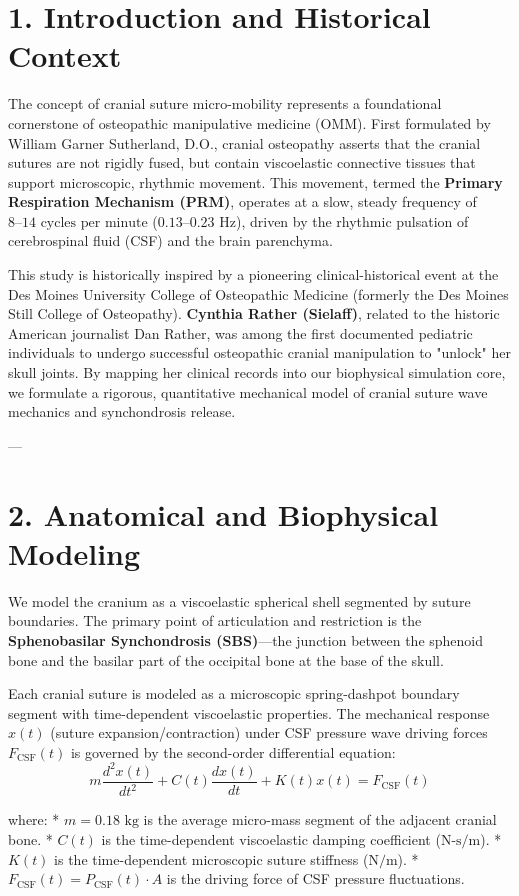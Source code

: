 \documentclass[11pt,twocolumn]{article}
\begin{document}
\section{1. Introduction and Historical Context}
The concept of cranial suture micro-mobility represents a foundational cornerstone of osteopathic manipulative medicine (OMM). First formulated by William Garner Sutherland, D.O., cranial osteopathy asserts that the cranial sutures are not rigidly fused, but contain viscoelastic connective tissues that support microscopic, rhythmic movement. This movement, termed the \textbf{Primary Respiration Mechanism (PRM)}, operates at a slow, steady frequency of $8\text{--}14\text{ cycles per minute}$ ($0.13\text{--}0.23\text{ Hz}$), driven by the rhythmic pulsation of cerebrospinal fluid (CSF) and the brain parenchyma.

This study is historically inspired by a pioneering clinical-historical event at the Des Moines University College of Osteopathic Medicine (formerly the Des Moines Still College of Osteopathy). \textbf{Cynthia Rather (Sielaff)}, related to the historic American journalist Dan Rather, was among the first documented pediatric individuals to undergo successful osteopathic cranial manipulation to "unlock" her skull joints. By mapping her clinical records into our biophysical simulation core, we formulate a rigorous, quantitative mechanical model of cranial suture wave mechanics and synchondrosis release.

---

\section{2. Anatomical and Biophysical Modeling}
We model the cranium as a viscoelastic spherical shell segmented by suture boundaries. The primary point of articulation and restriction is the \textbf{Sphenobasilar Synchondrosis (SBS)}—the junction between the sphenoid bone and the basilar part of the occipital bone at the base of the skull.

Each cranial suture is modeled as a microscopic spring-dashpot boundary segment with time-dependent viscoelastic properties. The mechanical response $x(t)$ (suture expansion/contraction) under CSF pressure wave driving forces $F_{\text{CSF}}(t)$ is governed by the second-order differential equation:
$$m \frac{d^2 x(t)}{dt^2} + C(t) \frac{dx(t)}{dt} + K(t) x(t) = F_{\text{CSF}}(t)$$

where:
*   $m = 0.18 \text{ kg}$ is the average micro-mass segment of the adjacent cranial bone.
*   $C(t)$ is the time-dependent viscoelastic damping coefficient ($\text{N-s/m}$).
*   $K(t)$ is the time-dependent microscopic suture stiffness ($\text{N/m}$).
*   $F_{\text{CSF}}(t) = P_{\text{CSF}}(t) \cdot A$ is the driving force of CSF pressure fluctuations.
\end{document}
